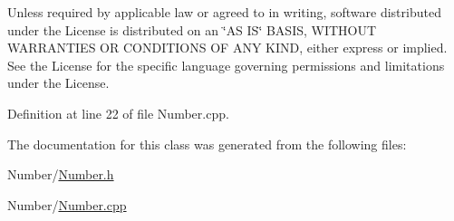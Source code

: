 \-Unless required by applicable law or agreed to in writing, software distributed under the \-License is distributed on an \char`\"{}\-A\-S I\-S\char`\"{} \-B\-A\-S\-I\-S, \-W\-I\-T\-H\-O\-U\-T \-W\-A\-R\-R\-A\-N\-T\-I\-E\-S \-O\-R \-C\-O\-N\-D\-I\-T\-I\-O\-N\-S \-O\-F \-A\-N\-Y \-K\-I\-N\-D, either express or implied. \-See the \-License for the specific language governing permissions and limitations under the \-License. 

\-Definition at line 22 of file \-Number.\-cpp.



\-The documentation for this class was generated from the following files\-:\begin{DoxyCompactItemize}
\item 
\-Number/\hyperlink{_number_8h}{\-Number.\-h}\item 
\-Number/\hyperlink{_number_8cpp}{\-Number.\-cpp}\end{DoxyCompactItemize}
